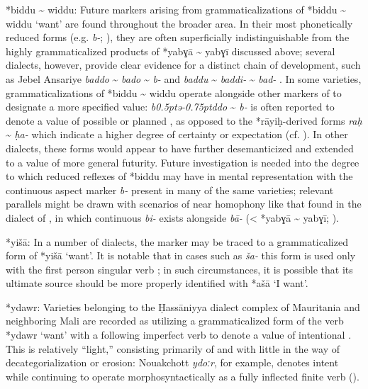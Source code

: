 \documentclass[output=paper]{langsci/langscibook}
\begin{document}
\begin{altdescription}
\item[*{biddu {\textasciitilde} widdu}:]
Future  markers arising from grammaticalizations of *{biddu {\textasciitilde} widdu} ‘want’ are found throughout the broader  area. In their most phonetically reduced forms (e.g.  \textit{b-}; \citealt{Behnstedt1994Soukhne}), they are often superficially indistinguishable from the highly grammaticalized products of *{yabɣā {\textasciitilde} yabɣī} discussed above; several dialects, however, provide clear evidence for a distinct chain of development, such as Jebel An\-sa\-ri\-ye \textit{baddo} {\textasciitilde} \textit{bado} {\textasciitilde} \textit{b-} \citep{Lewin1969} and  \textit{baddu} {\textasciitilde} \textit{baddi-} {\textasciitilde} \textit{bad-} \citep{Procházka2011Cilician}. In some varieties, grammaticalizations of *{biddu {\textasciitilde} widdu} operate alongside other markers of   to designate a more specified value:  \textit{b\kern 0.5ptǝ\kern -0.75ptddo} {\textasciitilde} \textit{b-} is often reported to denote a  value of possible or planned , as opposed to the *rāyiḥ{}-derived forms \textit{raḥ} {\textasciitilde} \textit{ḥa-} which indicate a higher degree of certainty or expectation (cf. \citealt{Lentin2011Damascus}). In other dialects, these forms would appear to have further desemanticized and extended to a value of more general futurity.  Future investigation is needed into the degree to which reduced reflexes of *biddu may have  in mental representation with the continuous aspect marker \textit{b-} present in many of the same varieties; relevant parallels might be drawn with scenarios of near homophony like that found in the dialect of , in which continuous \textit{bi-} exists alongside  \textit{bā}\textit{{}-} (< *yabɣā {\textasciitilde} yabɣī; \citealt{Davey2016}).

\item[*{yišā}:]
In a number of  dialects, the   marker may be traced to a grammaticalized form of *{yišā} ‘want’. It is notable that in cases such as  \textit{ša-} this form is used only with the first person singular verb \citep{Watson1993}; in such circumstances, it is possible that its ultimate source should be more properly identified with *{ašā} ‘I want’.

\item[*{ydawr}:]
Varieties belonging to the Ḥassāniyya dialect complex of Mauritania and neighboring Mali are recorded as utilizing a grammaticalized form of the verb *{ydawr} ‘want’ with a following imperfect verb to denote a value of intentional . This  is relatively “light,” consisting primarily of  and  with little in the way of decategorialization or erosion: Nouakchott \textit{ydoːr}, for example, denotes  intent while continuing to operate morphosyntactically as a fully inflected finite verb (\citealt{Taine-Cheikh2011hass}).


\end{altdescription}
\end{document}
